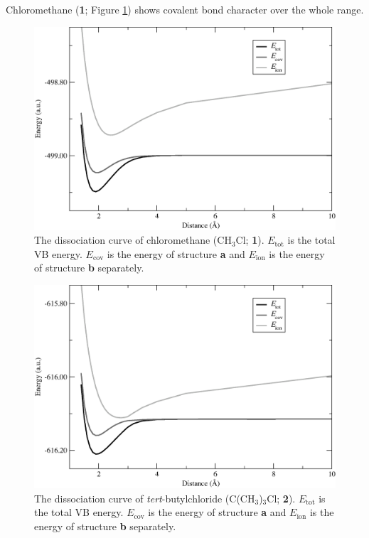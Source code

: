 Chloromethane (\textbf{1}; Figure \ref{ch3.fig.ch3cl}) shows covalent bond character over the whole range. 
\begin{figure}[htbp]
\begin{center}
\includegraphics[scale=0.55]{dissociation/figures/ch3cl_g.eps}
\end{center}
\caption{The dissociation curve of chloromethane (CH$_3$Cl; \textbf{1}). $E_\mathrm{tot}$ is the total VB energy. $E_\mathrm{cov}$ is the energy of structure \textbf{a} and $E_\mathrm{ion}$ is the energy of structure \textbf{b} separately.}
\label{ch3.fig.ch3cl}
\end{figure}
\begin{figure}[hbtp]
\begin{center}
\includegraphics[scale=0.55]{dissociation/figures/c4h9cl_g.eps}
\end{center}
\caption{The dissociation curve of \textit{tert}-butylchloride (C(CH$_3$)$_3$Cl; \textbf{2}). $E_\mathrm{tot}$ is the total VB energy. $E_\mathrm{cov}$ is the energy of structure \textbf{a} and $E_\mathrm{ion}$ is the energy of structure \textbf{b} separately. }
\label{ch3.fig.c4h9cl}
\end{figure}
